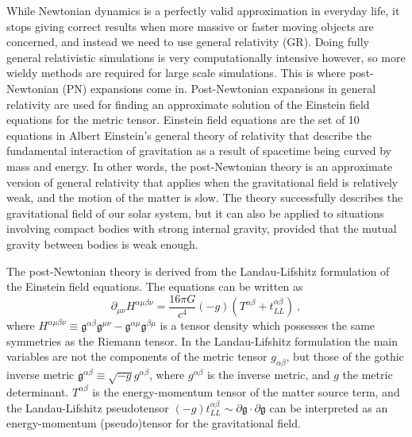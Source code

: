 \documentclass[english, oneside]{HYgradu}
\begin{document}
While Newtonian dynamics is a perfectly valid approximation in everyday life, it stops giving correct results when more massive or faster moving objects are concerned, and instead we need to use general relativity (GR). %
Doing fully general relativistic simulations is very computationally intensive however, so more wieldy methods are required for large scale simulations. This is where post-Newtonian (PN) expansions come in. Post-Newtonian expansions in general relativity are used for finding an approximate solution of the Einstein field equations for the metric tensor. %
Einstein field equations are the set of 10 equations in Albert Einstein's general theory of relativity that describe the fundamental interaction of gravitation as a result of spacetime being curved by mass and energy.
In other words, the post-Newtonian theory is an approximate version of general relativity that applies when the gravitational field is relatively weak, and the motion of the matter is slow. The theory successfully describes the gravitational field of our solar system, but it can also be applied to situations involving compact bodies with strong internal gravity, provided that the mutual gravity between bodies is weak enough.

The post-Newtonian theory is derived from the Landau-Lifshitz formulation of the Einstein field equations. The equations can be written as 
\begin{equation}
\partial_{\mu \nu} H^{\alpha \mu \beta \nu} = \frac{16 \pi G}{c^4}(-g)(T^{\alpha \beta} + t^{\alpha \beta}_{LL}) \ ,
\end{equation}
where $H^{\alpha \mu \beta \nu} \equiv \mathfrak{g}^{\alpha \beta} \mathfrak{g}^{\mu \nu} - \mathfrak{g}^{\alpha \mu} \mathfrak{g}^{\beta \mu}$ is a tensor density which possesses the same symmetries as the Riemann tensor. In the Landau-Lifshitz formulation the main variables are not the components of the metric tensor $g_{\alpha \beta}$, but those of the gothic inverse metric $\mathfrak{g}^{\alpha \beta} \equiv \sqrt{-g} g^{\alpha \beta}$, where $g^{\alpha \beta}$ is the inverse metric, and $g$ the metric determinant. $T^{\alpha \beta}$ is the energy-momentum tensor of the matter source term, and the Landau-Lifshitz pseudotensor $(-g) t^{\alpha \beta}_{LL} \sim \partial \mathfrak{g} \cdot \partial \mathfrak{g}$ can be interpreted as an energy-momentum (pseudo)tensor for the gravitational field.
\end{document}
